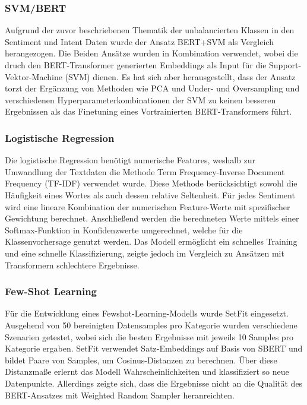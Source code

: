 \subsubsection{SVM/BERT}

Aufgrund der zuvor beschriebenen Thematik der unbalancierten Klassen in den Sentiment und
Intent Daten wurde der Ansatz BERT+SVM als Vergleich herangezogen. Die Beiden Ansätze wurden
in Kombination verwendet, wobei die druch den BERT-Transformer generierten Embeddings als Input
für die Support-Vektor-Machine (SVM) dienen. Es hat sich aber herausgestellt, dass der Ansatz
torzt der Ergänzung von Methoden wie PCA und Under- und Oversampling und verschiedenen
Hyperparameterkombinationen der SVM zu keinen besseren Ergebnissen als das Finetuning eines
Vortrainierten BERT-Transformers führt.  

\subsubsection{Logistische Regression}

Die logistische Regression benötigt numerische Features, weshalb zur Umwandlung der 
Textdaten die Methode Term Frequency-Inverse Document Frequency (TF-IDF) verwendet wurde. Diese Methode 
berücksichtigt sowohl die Häufigkeit eines Wortes als auch dessen relative Seltenheit. Für jedes Sentiment 
wird eine lineare Kombination der numerischen Feature-Werte mit spezifischer Gewichtung berechnet.
 Anschließend werden die berechneten Werte mittels einer Softmax-Funktion in Konfidenzwerte umgerechnet,
  welche für die Klassenvorhersage genutzt werden. Das Modell ermöglicht ein schnelles Training und eine schnelle Klassifizierung,
 zeigte jedoch im Vergleich zu Ansätzen mit Transformern schlechtere Ergebnisse. 

\subsubsection{Few-Shot Learning}

Für die Entwicklung eines Fewshot-Learning-Modells wurde SetFit eingesetzt. Ausgehend von
50 bereinigten Datensamples pro Kategorie wurden verschiedene Szenarien getestet, wobei sich
die besten Ergebnisse mit jeweils 10 Samples pro Kategorie ergaben. SetFit verwendet
Satz-Embeddings auf Basis von SBERT und bildet Paare von Samples, um Cosinus-Distanzen zu
berechnen. Über diese Distanzmaße erlernt das Modell Wahrscheinlichkeiten und klassifiziert so
neue Datenpunkte. Allerdings zeigte sich, dass die Ergebnisse nicht an die Qualität des
BERT-Ansatzes mit Weighted Random Sampler heranreichten.

